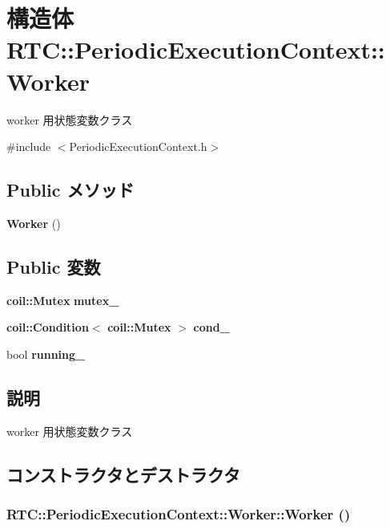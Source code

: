 \section{構造体 RTC::PeriodicExecutionContext::Worker}
\label{structRTC_1_1PeriodicExecutionContext_1_1Worker}


worker 用状態変数クラス  




{\ttfamily \#include $<$PeriodicExecutionContext.h$>$}

\subsection*{Public メソッド}
\begin{DoxyCompactItemize}
\item 
{\bf Worker} ()
\end{DoxyCompactItemize}
\subsection*{Public 変数}
\begin{DoxyCompactItemize}
\item 
{\bf coil::Mutex} {\bf mutex\_\-}
\item 
{\bf coil::Condition}$<$ {\bf coil::Mutex} $>$ {\bf cond\_\-}
\item 
bool {\bf running\_\-}
\end{DoxyCompactItemize}


\subsection{説明}
worker 用状態変数クラス 

\subsection{コンストラクタとデストラクタ}
\subsubsection[{Worker}]{\setlength{\rightskip}{0pt plus 5cm}RTC::PeriodicExecutionContext::Worker::Worker ()\hspace{0.3cm}{\ttfamily  [inline]}}\label{structRTC_1_1PeriodicExecutionContext_1_1Worker_aac0bb41d90af7824afefa8c8e44d99a6}


